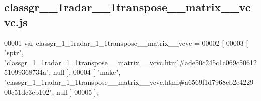 \subsection{classgr\+\_\+\_\+1radar\+\_\+\_\+1transpose\+\_\+\+\_\+matrix\+\_\+\+\_\+vcvc.\+js}
\label{classgr__1__1radar__1__1transpose____matrix____vcvc_8js_source}

\begin{DoxyCode}
00001 var classgr_1_1radar_1_1transpose__matrix__vcvc =
00002 [
00003     [ \textcolor{stringliteral}{"sptr"}, \textcolor{stringliteral}{"classgr\_1\_1radar\_1\_1transpose\_\_matrix\_\_vcvc.html#ade50c245c1c069c5061251099368734a"}, null ],
00004     [ \textcolor{stringliteral}{"make"}, \textcolor{stringliteral}{"classgr\_1\_1radar\_1\_1transpose\_\_matrix\_\_vcvc.html#a6569f1d7968cb2e422900c51dc3cb102"}, null ]
00005 ];
\end{DoxyCode}
